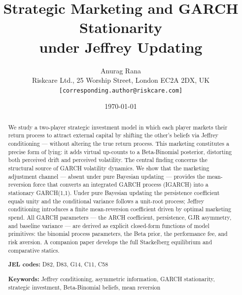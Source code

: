 \documentclass[12pt,a4paper]{article}
\newcommand{\1}{\mathbf{1}}
\begin{document}

\title{\textbf{Strategic Marketing and GARCH Stationarity\\
under Jeffrey Updating}}

\author{Anurag Rana\\[4pt]
\small Riskcare Ltd., 25 Worship Street, London EC2A 2DX, UK\\
\small \texttt{[corresponding.author@riskcare.com]}
}

\date{\today}

\maketitle

\begin{abstract}
We study a two-player strategic investment model in which each player
markets their return process to attract external capital by shifting the
other's beliefs via Jeffrey conditioning --- without altering the true
return process. This marketing constitutes a precise form of lying: it
adds virtual up-counts to a Beta-Binomial posterior, distorting both
perceived drift and perceived volatility. The central finding concerns
the structural source of GARCH volatility dynamics. We show that the
marketing adjustment channel --- absent under pure Bayesian updating ---
provides the mean-reversion force that converts an integrated GARCH
process (IGARCH) into a stationary GARCH(1,1). Under pure Bayesian
updating the persistence coefficient equals unity and the conditional
variance follows a unit-root process; Jeffrey conditioning introduces
a finite mean-reversion coefficient driven by optimal marketing spend.
All GARCH parameters --- the ARCH coefficient, persistence, GJR
asymmetry, and baseline variance --- are derived as explicit closed-form
functions of model primitives: the binomial process parameters, the Beta
prior, the performance fee, and risk aversion. A companion paper
develops the full Stackelberg equilibrium and comparative statics.

\medskip\noindent
\textbf{JEL codes:} D82, D83, G14, C11, C58

\medskip\noindent
\textbf{Keywords:} Jeffrey conditioning, asymmetric information,
GARCH stationarity, strategic investment, Beta-Binomial beliefs,
mean reversion
\end{abstract}

\newpage
\end{document}
